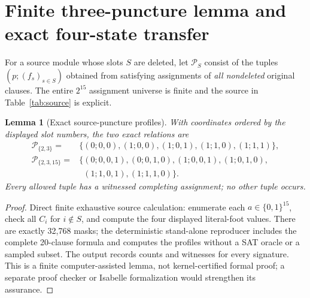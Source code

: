 \documentclass[11pt]{article}
\newtheorem{lemma}[theorem]{Lemma}
\begin{document}
\section{Finite three-puncture lemma and exact four-state transfer}
For a source module whose slots $S$ are deleted, let $\mathcal P_S$ consist of the tuples $(p;(f_s)_{s\in S})$ obtained from satisfying assignments of \emph{all nondeleted} original clauses. The entire $2^{15}$ assignment universe is finite and the source in Table~\ref{tab:source} is explicit.
\begin{lemma}[Exact source-puncture profiles]\label{lem:profile}
With coordinates ordered by the displayed slot numbers, the two exact relations are
\begin{align*}
 \mathcal P_{\{2,3\}}={}&\{(0;0,0),(1;0,0),(1;0,1),(1;1,0),(1;1,1)\},\\
 \mathcal P_{\{2,3,15\}}={}&\{(0;0,0,1),(0;0,1,0),(1;0,0,1),(1;0,1,0),\\
 &\phantom{\{}(1;1,0,1),(1;1,1,0)\}.
\end{align*}
Every allowed tuple has a witnessed completing assignment; no other tuple occurs.
\end{lemma}
\begin{proof}
Direct finite exhaustive source calculation: enumerate each $a\in\{0,1\}^{15}$, check all $C_i$ for $i\notin S$, and compute the four displayed literal-foot values. There are exactly 32,768 masks; the deterministic stand-alone reproducer includes the complete 20-clause formula and computes the profiles without a SAT oracle or a sampled subset. The output records counts and witnesses for every signature. This is a finite computer-assisted lemma, not kernel-certified formal proof; a separate proof checker or Isabelle formalization would strengthen its assurance.
\end{proof}
\end{document}
